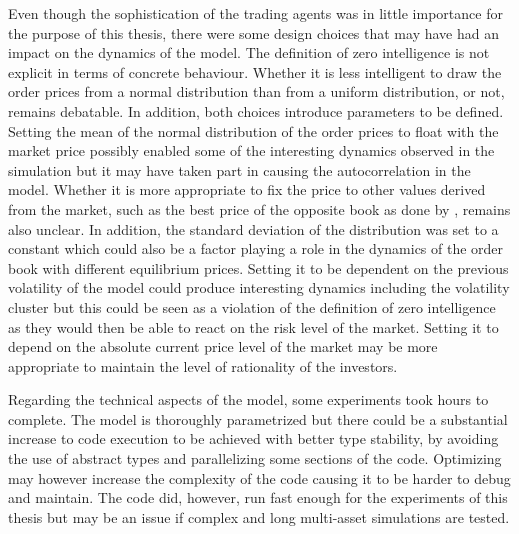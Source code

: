 Even though the sophistication of the trading agents was in little
importance for the purpose of this thesis, there were some design
choices that may have had an impact on the dynamics of the model.
The definition of zero intelligence is not explicit in terms of
concrete behaviour. Whether it is less intelligent to draw the
order prices from a normal distribution than from a uniform
distribution, or not, remains debatable. In addition, both choices
introduce parameters to be defined. Setting the mean of the
normal distribution of the order prices to float with the 
market price possibly enabled some of the interesting dynamics
observed in the simulation but it may have taken part in causing the
autocorrelation in the model. Whether it is more appropriate
to fix the price to other values derived from the market,
such as the best price of the opposite book as done by
\citet{Genoa01}, remains also unclear. In addition, the 
standard deviation of the distribution was set to a constant
which could also be a factor playing a role in the dynamics 
of the order book with different equilibrium prices. Setting
it to be dependent on the previous volatility of the model
could produce interesting dynamics including the volatility
cluster but this could be seen as a violation of the definition
of zero intelligence as they would then be able to react on the risk level
of the market. Setting it to depend on the absolute 
current price level of the market may be more appropriate to 
maintain the level of rationality of the investors. 

Regarding the technical aspects of the model, some experiments 
took hours to complete. The model is thoroughly parametrized but 
there could be a substantial increase to code execution to be 
achieved with better type stability, by avoiding the use of 
abstract types and parallelizing some sections of the code. 
Optimizing may however increase the complexity of the code 
causing it to be harder to debug and maintain. The code did, however, 
run fast enough for the experiments of this thesis but may be 
an issue if complex and long multi-asset simulations are tested. 

